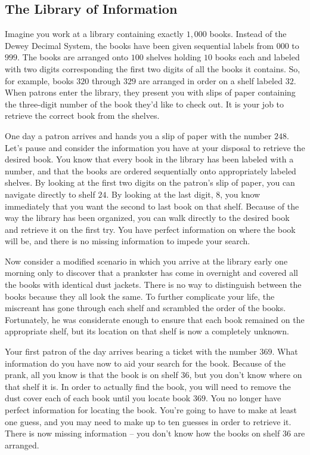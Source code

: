 \documentclass[11pt, oneside]{article}   	%
\begin{document}
\subsection{The Library of Information}
Imagine you work at a library containing exactly $1,000$ books.  Instead of the
Dewey Decimal System, the books have been given sequential labels from $000$ to
$999$.  The books are arranged onto $100$ shelves holding $10$ books each and
labeled with two digits corresponding the first two digits of all the books it
contains.  So, for example, books $320$ through $329$ are arranged in order on a
shelf labeled $32$.  When patrons enter the library, they present you with slips
of paper containing the three-digit number of the book they'd like to check out.
It is your job to retrieve the correct book from the shelves.

One day a patron arrives and hands you a slip of paper with the number $248$.
Let's pause and consider the information you have at your disposal to retrieve
the desired book.  You know that every book in the library has been labeled with
a number, and that the books are ordered sequentially onto appropriately labeled
shelves.  By looking at the first two digits on the patron's slip of paper, you
can navigate directly to shelf $24$.  By looking at the last digit, $8$, you
know immediately that you want the second to last book on that shelf.  Because
of the way the library has been organized, you can walk directly to the desired
book and retrieve it on the first try.  You have perfect information on where
the book will be, and there is no missing information to impede your search.

Now consider a modified scenario in which you arrive at the library early one
morning only to discover that a prankster has come in overnight and covered all
the books with identical dust jackets.  There is no way to distinguish between
the books because they all look the same.  To further complicate your life, the
miscreant has gone through each shelf and scrambled the order of the books.
Fortunately, he was considerate enough to ensure that each book remained on the
appropriate shelf, but its location on that shelf is now a completely unknown.

Your first patron of the day arrives bearing a ticket with the number $369$.
What information do you have now to aid your search for the book.  Because of
the prank, all you know is that the book is on shelf $36$, but you don't know
where on that shelf it is.  In order to actually find the book, you will need to
remove the dust cover each of each book until you locate book $369$.  You no
longer have perfect information for locating the book.  You're going to have to
make at least one guess, and you may need to make up to ten guesses in order to
retrieve it.  There is now missing information -- you don't know how the books
on shelf $36$ are arranged.
\end{document}
